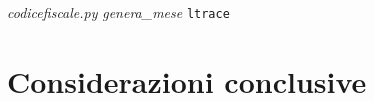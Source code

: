 \documentclass{article}
\newcommand{\filename}[1]{\textit{#1}}
\newcommand{\function}[1]{\textit{#1}}
\newcommand{\command}[1]{\texttt{#1}}
\begin{document}


\filename{codicefiscale.py}
\function{genera\_mese}
\command{ltrace}

\section{Considerazioni conclusive}



\newpage




\nocite{crawler}
\end{document}
